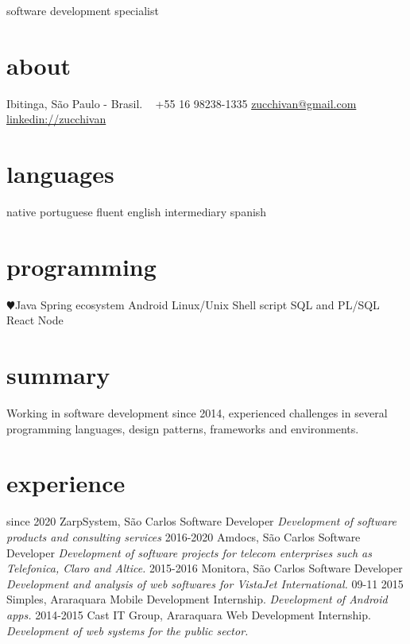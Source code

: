 \documentclass[]{friggeri-cv}
\begin{document}
       {software development specialist}


\begin{aside}
  \section{about}
    Ibitinga,
    São Paulo - Brasil.
    ~
    +55 16 98238-1335
    \href{mailto:zucchivan@gmail.com}{zucchivan@gmail.com}
    \href{http://linkedin.com/zuccchivan}{linkedin://zucchivan}
  \section{languages}
    native portuguese
    fluent english
    intermediary spanish
  \section{programming}
    {\color{red} $\varheartsuit$}Java
    Spring ecosystem
    Android
    Linux/Unix
    Shell script
    SQL and PL/SQL
    React
    Node
\end{aside}

\section{summary}
    Working in software development since 2014, experienced challenges in several programming languages, design patterns, frameworks and environments. 

\section{experience}
\begin{entrylist}
  \entry
    {since 2020}
    {ZarpSystem, São Carlos}
    {Software Developer}
    {\emph{Development of software products and consulting services}}
  \entry
    {2016-2020}
    {Amdocs, São Carlos}
    {Software Developer}
    {\emph{Development of software projects for telecom enterprises such as Telefonica, Claro and Altice.}}
  \entry
    {2015-2016}
    {Monitora, São Carlos}
    {Software Developer}
    {\emph{Development and analysis of web softwares for VistaJet International.}}
  \entry
    {09-11 2015}
    {Simples, Araraquara}
    {Mobile Development Internship.}
    {\emph{Development of Android apps.}}
  \entry
    {2014-2015}
    {Cast IT Group, Araraquara}
    {Web Development Internship.}
    {\emph{Development of web systems for the public sector.}}


\end{entrylist}
    
\end{document}
